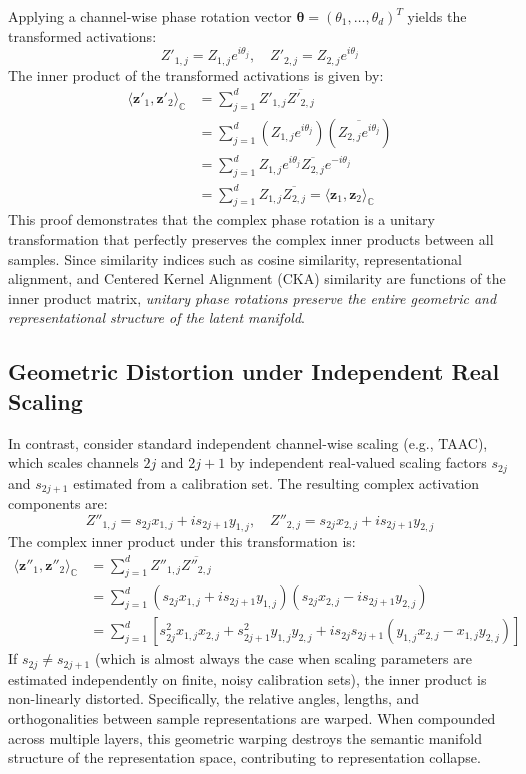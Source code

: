 \documentclass{article}
\begin{document}
Applying a channel-wise phase rotation vector $\boldsymbol{\theta} = (\theta_1, \dots, \theta_d)^T$ yields the transformed activations:
\begin{equation}
    Z'_{1, j} = Z_{1, j} e^{i\theta_j}, \quad Z'_{2, j} = Z_{2, j} e^{i\theta_j}
\end{equation}
The inner product of the transformed activations is given by:
\begin{align}
    \langle \mathbf{z}'_1, \mathbf{z}'_2 \rangle_{\mathbb{C}} &= \sum_{j=1}^d Z'_{1, j} \overline{Z'_{2, j}} \\
    &= \sum_{j=1}^d (Z_{1, j} e^{i\theta_j}) \left( \overline{Z_{2, j} e^{i\theta_j}} \right) \\
    &= \sum_{j=1}^d Z_{1, j} e^{i\theta_j} \overline{Z_{2, j}} e^{-i\theta_j} \\
    &= \sum_{j=1}^d Z_{1, j} \overline{Z_{2, j}} = \langle \mathbf{z}_1, \mathbf{z}_2 \rangle_{\mathbb{C}}
\end{align}
This proof demonstrates that the complex phase rotation is a unitary transformation that perfectly preserves the complex inner products between all samples. Since similarity indices such as cosine similarity, representational alignment, and Centered Kernel Alignment (CKA) similarity are functions of the inner product matrix, \textit{unitary phase rotations preserve the entire geometric and representational structure of the latent manifold}.

\subsection{Geometric Distortion under Independent Real Scaling}
In contrast, consider standard independent channel-wise scaling (e.g., TAAC), which scales channels $2j$ and $2j+1$ by independent real-valued scaling factors $s_{2j}$ and $s_{2j+1}$ estimated from a calibration set. The resulting complex activation components are:
\begin{equation}
    Z''_{1, j} = s_{2j} x_{1, j} + i s_{2j+1} y_{1, j}, \quad Z''_{2, j} = s_{2j} x_{2, j} + i s_{2j+1} y_{2, j}
\end{equation}
The complex inner product under this transformation is:
\begin{align}
    \langle \mathbf{z}''_1, \mathbf{z}''_2 \rangle_{\mathbb{C}} &= \sum_{j=1}^d Z''_{1, j} \overline{Z''_{2, j}} \\
    &= \sum_{j=1}^d \left( s_{2j} x_{1, j} + i s_{2j+1} y_{1, j} \right) \left( s_{2j} x_{2, j} - i s_{2j+1} y_{2, j} \right) \\
    &= \sum_{j=1}^d \left[ s_{2j}^2 x_{1, j} x_{2, j} + s_{2j+1}^2 y_{1, j} y_{2, j} + i s_{2j} s_{2j+1} \left( y_{1, j} x_{2, j} - x_{1, j} y_{2, j} \right) \right]
\end{align}
If $s_{2j} \neq s_{2j+1}$ (which is almost always the case when scaling parameters are estimated independently on finite, noisy calibration sets), the inner product is non-linearly distorted. Specifically, the relative angles, lengths, and orthogonalities between sample representations are warped. When compounded across multiple layers, this geometric warping destroys the semantic manifold structure of the representation space, contributing to representation collapse. 
\end{document}
